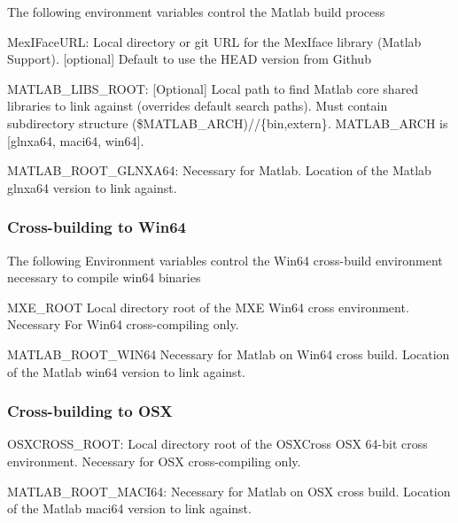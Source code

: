 The following environment variables control the Matlab build process
\begin{DoxyItemize}
\item {\ttfamily Mex\+I\+Face\+U\+RL}\+: Local directory or git U\+RL for the Mex\+Iface library (Matlab Support). \mbox{[}optional\mbox{]} Default to use the {\ttfamily H\+E\+AD} version from Github
\item {\ttfamily M\+A\+T\+L\+A\+B\+\_\+\+L\+I\+B\+S\+\_\+\+R\+O\+OT}\+: \mbox{[}Optional\mbox{]} Local path to find Matlab core shared libraries to link against (overrides default search paths). Must contain subdirectory structure {\ttfamily (\$\+M\+A\+T\+L\+A\+B\+\_\+\+A\+R\+CH)//\{bin,extern\}}. {\ttfamily M\+A\+T\+L\+A\+B\+\_\+\+A\+R\+CH} is \mbox{[}glnxa64, maci64, win64\mbox{]}.
\item {\ttfamily M\+A\+T\+L\+A\+B\+\_\+\+R\+O\+O\+T\+\_\+\+G\+L\+N\+X\+A64}\+: Necessary for Matlab. Location of the Matlab {\ttfamily glnxa64} version to link against.
\end{DoxyItemize}

\subsubsection*{Cross-\/building to Win64}

The following Environment variables control the Win64 cross-\/build environment necessary to compile win64 binaries
\begin{DoxyItemize}
\item {\ttfamily M\+X\+E\+\_\+\+R\+O\+OT} Local directory root of the M\+XE Win64 cross environment. Necessary For Win64 cross-\/compiling only.
\item {\ttfamily M\+A\+T\+L\+A\+B\+\_\+\+R\+O\+O\+T\+\_\+\+W\+I\+N64} Necessary for Matlab on Win64 cross build. Location of the Matlab {\ttfamily win64} version to link against.
\end{DoxyItemize}

\subsubsection*{Cross-\/building to O\+SX}


\begin{DoxyItemize}
\item {\ttfamily O\+S\+X\+C\+R\+O\+S\+S\+\_\+\+R\+O\+OT}\+: Local directory root of the O\+S\+X\+Cross O\+SX 64-\/bit cross environment. Necessary for O\+SX cross-\/compiling only.
\item {\ttfamily M\+A\+T\+L\+A\+B\+\_\+\+R\+O\+O\+T\+\_\+\+M\+A\+C\+I64}\+: Necessary for Matlab on O\+SX cross build. Location of the Matlab {\ttfamily maci64} version to link against. 
\end{DoxyItemize}